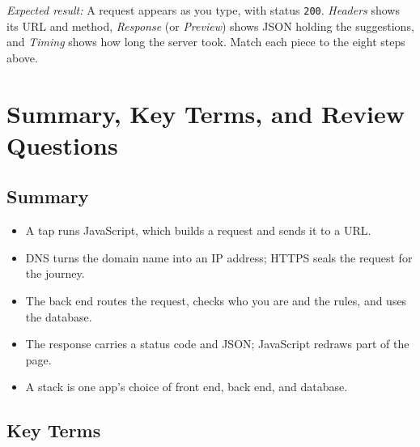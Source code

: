 \emph{Expected result:} A request appears as you type, with status \texttt{200}. \emph{Headers} shows its URL and method, \emph{Response} (or \emph{Preview}) shows JSON holding the suggestions, and \emph{Timing} shows how long the server took. Match each piece to the eight steps above.

\section{Summary, Key Terms, and Review Questions}\label{04-following-one-tap:summary-key-terms-and-review-questions}

\subsection*{Summary}\label{04-following-one-tap:summary}

\begin{itemize}
\tightlist
\item
  A tap runs JavaScript, which builds a request and sends it to a URL.
\item
  DNS turns the domain name into an IP address; HTTPS seals the request for the journey.
\item
  The back end routes the request, checks who you are and the rules, and uses the database.
\item
  The response carries a status code and JSON; JavaScript redraws part of the page.
\item
  A stack is one app's choice of front end, back end, and database.
\end{itemize}


\subsection*{Key Terms}\label{04-following-one-tap:key-terms}

